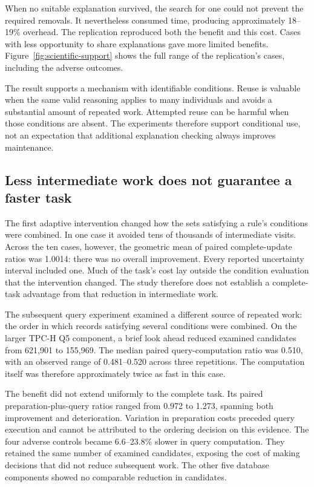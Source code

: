 \documentclass{article}
\begin{document}
When no suitable explanation survived, the search for one could not prevent
the required removals. It nevertheless consumed time, producing approximately
18--19\% overhead. The replication reproduced both the benefit and this cost.
Cases with less opportunity to share explanations gave more limited benefits.
Figure~\ref{fig:scientific-support} shows the full range of the replication's
cases, including the adverse outcomes.

The result supports a mechanism with identifiable conditions. Reuse is
valuable when the same valid reasoning applies to many individuals and avoids
a substantial amount of repeated work. Attempted reuse can be harmful when
those conditions are absent. The experiments therefore support conditional
use, not an expectation that additional explanation checking always improves
maintenance.



\subsection{Less intermediate work does not guarantee a faster task}
The first adaptive intervention changed how the sets satisfying a rule's
conditions were combined. In one case it avoided tens of thousands of
intermediate visits. Across the ten cases, however, the geometric mean of
paired complete-update ratios was 1.0014: there was no overall improvement.
Every reported uncertainty interval included one. Much of the task's cost
lay outside the condition evaluation that the intervention changed. The study
therefore does not establish a complete-task advantage from that reduction
in intermediate work.

The subsequent query experiment examined a different source of repeated work:
the order in which records satisfying several conditions were combined. On the
larger TPC-H Q5 component, a brief look ahead reduced examined candidates from
621,901 to 155,969. The median paired query-computation ratio was 0.510, with
an observed range of 0.481--0.520 across three repetitions. The computation
itself was therefore approximately twice as fast in this case.

The benefit did not extend uniformly to the complete task. Its paired
preparation-plus-query ratios ranged from 0.972 to 1.273, spanning both
improvement and deterioration. Variation in preparation costs preceded query
execution and cannot be attributed to the ordering decision on this evidence.
The four adverse controls became 6.6--23.8\% slower in query computation.
They retained the same number of examined candidates, exposing the cost of
making decisions that did not reduce subsequent work. The other five database
components showed no comparable reduction in candidates.
\end{document}
